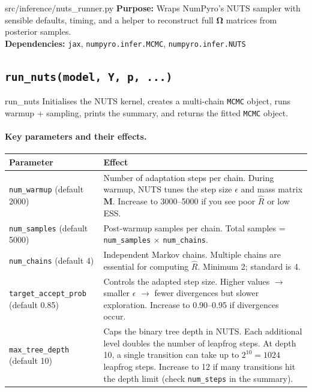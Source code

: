 \documentclass[11pt,a4paper]{article}
\newcommand{\bOmega}{\bm{\Omega}}
\begin{document}
\begin{filecard}{src/inference/nuts\_runner.py}
\textbf{Purpose:} Wraps NumPyro's NUTS sampler with sensible defaults, timing, and a helper to reconstruct full $\bOmega$ matrices from posterior samples.
\\[0.3em]
\textbf{Dependencies:} \texttt{jax}, \texttt{numpyro.infer.MCMC}, \texttt{numpyro.infer.NUTS}
\end{filecard}

\subsection{\texttt{run\_nuts(model, Y, p, ...)}}

\begin{funccard}{run\_nuts}
Initialises the NUTS kernel, creates a multi-chain \texttt{MCMC} object, runs warmup + sampling, prints the summary, and returns the fitted \texttt{MCMC} object.
\end{funccard}

\paragraph{Key parameters and their effects.}
\begin{center}
\begin{tabular}{@{}lp{9cm}@{}}
\toprule
Parameter & Effect \\
\midrule
\texttt{num\_warmup} (default 2000) & Number of adaptation steps per chain. During warmup, NUTS tunes the step size $\epsilon$ and mass matrix $\bm{M}$. Increase to 3000--5000 if you see poor $\hat{R}$ or low ESS. \\
\texttt{num\_samples} (default 5000) & Post-warmup samples per chain. Total samples = \texttt{num\_samples} $\times$ \texttt{num\_chains}. \\
\texttt{num\_chains} (default 4) & Independent Markov chains. Multiple chains are essential for computing $\hat{R}$. Minimum 2; standard is 4. \\
\texttt{target\_accept\_prob} (default 0.85) & Controls the adapted step size. Higher values $\to$ smaller $\epsilon$ $\to$ fewer divergences but slower exploration. Increase to 0.90--0.95 if divergences occur. \\
\texttt{max\_tree\_depth} (default 10) & Caps the binary tree depth in NUTS. Each additional level doubles the number of leapfrog steps. At depth 10, a single transition can take up to $2^{10} = 1024$ leapfrog steps. Increase to 12 if many transitions hit the depth limit (check \texttt{num\_steps} in the summary). \\
\bottomrule
\end{tabular}
\end{center}
\end{document}
